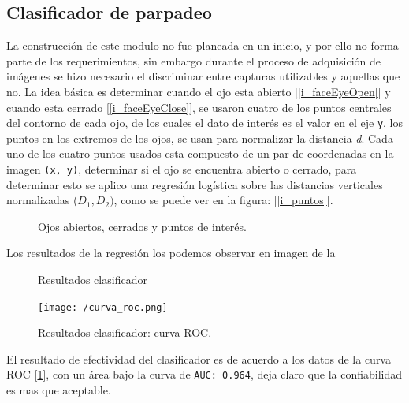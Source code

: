 \documentclass[12pt]{book} %
\begin{document}
	\subsection{Clasificador de parpadeo} 
		La construcción de este modulo no fue planeada en un inicio, y por ello no forma parte de los requerimientos, sin embargo
		durante el proceso de adquisición de imágenes se hizo necesario el discriminar entre capturas utilizables y aquellas que no.
		La idea básica es determinar cuando el ojo esta abierto [\ref{i_faceEyeOpen}] y cuando esta cerrado [\ref{i_faceEyeClose}], 
		se usaron cuatro de los puntos centrales del contorno de cada ojo, de los cuales el dato de interés es el valor en el eje \texttt{y},
		los puntos en los extremos de los ojos, se usan para normalizar la distancia \textit{d}.
		Cada uno de los cuatro puntos usados esta compuesto de un par de coordenadas en la imagen \texttt{(x, y)}, determinar si el ojo se 
		encuentra abierto o cerrado, para determinar esto se aplico una regresión logística sobre las distancias verticales normalizadas 
		($D_{1}, D_{2})$, como se puede ver en la figura: [\ref{i_puntos}].		
		\begin{figure}[t]
			\centering
			\caption{Ojos abiertos, cerrados y puntos de interés. }
		\end{figure}	
		
		Los resultados de la regresión los podemos observar en imagen de la 
		\begin{figure}[hbt]
			\centering
			\caption{Resultados clasificador}
		\end{figure}
		\begin{figure}[hbt]
			\centering
			\texttt{[image: /curva\_roc.png]} 
			\caption{Resultados clasificador: curva ROC. \label{i_curva_roc}}
		\end{figure}
		El resultado de efectividad del clasificador es de acuerdo a los datos de la curva ROC [\ref{i_curva_roc}], con un área bajo la curva 
		de \texttt{AUC: 0.964}, deja claro que la confiabilidad es mas que aceptable.
		
\end{document}
